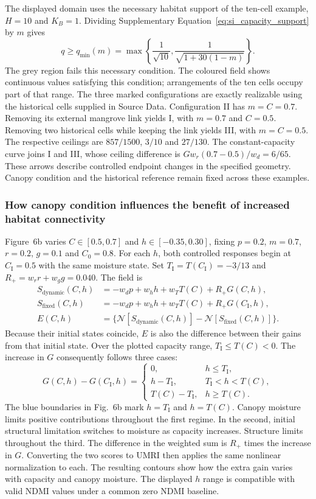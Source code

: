 The displayed domain uses the necessary habitat support of the ten-cell example, $H=10$ and $K_B=1$. Dividing Supplementary Equation~\eqref{eq:si_capacity_support} by $m$ gives
\[
q\geq q_{\min}(m)=\max\!\left\{\frac1{\sqrt{10}},\frac1{\sqrt{1+30(1-m)}}\right\}.
\]
The grey region fails this necessary condition. The coloured field shows continuous values satisfying this condition; arrangements of the ten cells occupy part of that range. The three marked configurations are exactly realizable using the historical cells supplied in Source Data. Configuration II has $m=C=0.7$. Removing its external mangrove link yields I, with $m=0.7$ and $C=0.5$. Removing two historical cells while keeping the link yields III, with $m=C=0.5$. The respective ceilings are $857/1500$, $3/10$ and $27/130$. The constant-capacity curve joins I and III, whose ceiling difference is $G w_r(0.7-0.5)/w_d=6/65$. These arrows describe controlled endpoint changes in the specified geometry. Canopy condition and the historical reference remain fixed across these examples.

\subsubsection{How canopy condition influences the benefit of increased habitat connectivity}

Figure~6b varies $C\in[0.5,0.7]$ and $h\in[-0.35,0.30]$, fixing $p=0.2$, $m=0.7$, $r=0.2$, $g=0.1$ and $C_0=0.8$. For each $h$, both controlled responses begin at $C_{\mathrm I}=0.5$ with the same moisture state. Set $T_{\mathrm I}=T(C_{\mathrm I})=-3/13$ and $R_+=w_rr+w_gg=0.040$. The field is
\[
\begin{aligned}
S_{\mathrm{dynamic}}(C,h)&=-w_dp+w_hh+w_TT(C)+R_+G(C,h),\\
S_{\mathrm{fixed}}(C,h)&=-w_dp+w_hh+w_TT(C)+R_+G(C_{\mathrm I},h),\\
E(C,h)&=\{\mathcal N[S_{\mathrm{dynamic}}(C,h)]-\mathcal N[S_{\mathrm{fixed}}(C,h)]\}.
\end{aligned}
\]
Because their initial states coincide, $E$ is also the difference between their gains from that initial state. Over the plotted capacity range, $T_{\mathrm I}\leq T(C)<0$. The increase in $G$ consequently follows three cases:
\[
G(C,h)-G(C_{\mathrm I},h)=
\begin{cases}
0,&h\leq T_{\mathrm I},\\
h-T_{\mathrm I},&T_{\mathrm I}<h<T(C),\\
T(C)-T_{\mathrm I},&h\geq T(C).
\end{cases}
\]
The blue boundaries in Fig.~6b mark $h=T_{\mathrm I}$ and $h=T(C)$. Canopy moisture limits positive contributions throughout the first regime. In the second, initial structural limitation switches to moisture as capacity increases. Structure limits throughout the third. The difference in the weighted sum is $R_+$ times the increase in $G$. Converting the two scores to UMRI then applies the same nonlinear normalization to each. The resulting contours show how the extra gain varies with capacity and canopy moisture. The displayed $h$ range is compatible with valid NDMI values under a common zero NDMI baseline.

